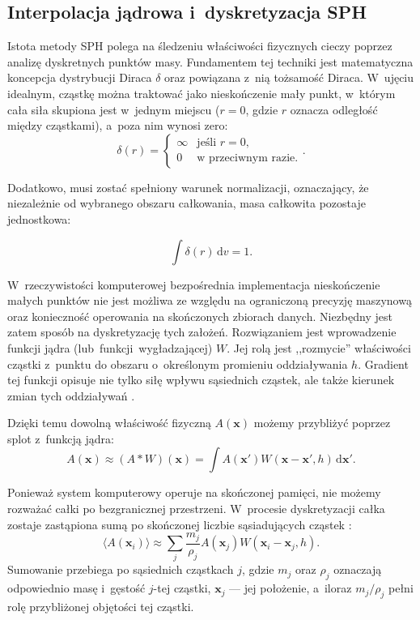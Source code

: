 \subsection{Interpolacja jądrowa i~dyskretyzacja SPH}
\label{subsec:kernel-interpolation}
Istota metody SPH polega na śledzeniu właściwości fizycznych cieczy poprzez analizę dyskretnych punktów masy. Fundamentem tej techniki jest matematyczna koncepcja dystrybucji Diraca $\delta$ oraz powiązana z~nią tożsamość Diraca. W~ujęciu idealnym, cząstkę można traktować jako nieskończenie mały punkt, w~którym cała siła skupiona jest w~jednym miejscu ($r = 0$, gdzie $r$ oznacza odległość między cząstkami), a~poza nim wynosi zero:
\begin{equation}
    \delta(r) = \begin{cases} \infty & \text{jeśli } r = 0, \\ 0 & \text{w przeciwnym razie.} \end{cases}.
\end{equation}

Dodatkowo, musi zostać spełniony warunek normalizacji, oznaczający, że niezależnie od wybranego obszaru całkowania, masa całkowita pozostaje jednostkowa: 

\begin{equation}
    \int \delta(r) \,\mathrm{d}v = 1.
\end{equation}


W~rzeczywistości komputerowej bezpośrednia implementacja nieskończenie małych punktów nie jest możliwa ze 
względu na ograniczoną precyzję maszynową oraz konieczność operowania na skończonych zbiorach danych. 
Niezbędny jest zatem sposób na dyskretyzację tych założeń. Rozwiązaniem jest wprowadzenie funkcji jądra  
(lub~funkcji~wygładzającej) $W$. Jej rolą jest ,,rozmycie'' właściwości cząstki z~punktu do obszaru o~określonym
promieniu oddziaływania $h$. Gradient tej funkcji opisuje nie tylko siłę wpływu sąsiednich cząstek,
ale także kierunek zmian tych oddziaływań \cite{koschier2020smoothed}.

Dzięki temu dowolną właściwość fizyczną $A(\mathbf{x})$ możemy przybliżyć poprzez splot z~funkcją jądra:
\begin{equation}
    A(\mathbf{x}) \approx (A * W)(\mathbf{x}) = \int A(\mathbf{x}') W(\mathbf{x} - \mathbf{x}', h) \,\mathrm{d}\mathbf{x}'.
\end{equation}

Ponieważ system komputerowy operuje na skończonej pamięci, nie możemy rozważać całki po bezgranicznej przestrzeni. W~procesie dyskretyzacji całka zostaje zastąpiona sumą po skończonej liczbie sąsiadujących cząstek \cite{mon92}:
\begin{equation}
    \langle A(\mathbf{x}_i) \rangle \approx \sum_j \frac{m_j}{\rho_j} A(\mathbf{x}_j) W(\mathbf{x}_i - \mathbf{x}_j, h).
    \label{eq:sph_discretization}
\end{equation}
Sumowanie przebiega po sąsiednich cząstkach $j$, gdzie $m_j$ oraz $\rho_j$ oznaczają odpowiednio masę i~gęstość $j$-tej cząstki, $\mathbf{x}_j$ --- jej położenie, a~iloraz $m_j/\rho_j$ pełni rolę przybliżonej objętości tej cząstki.


